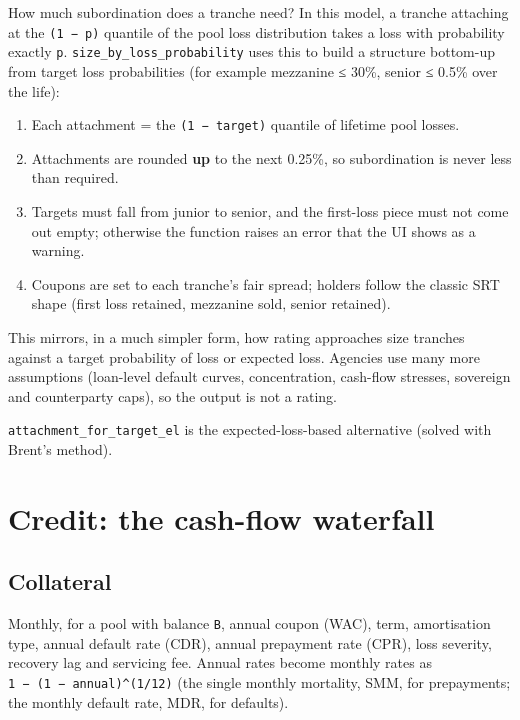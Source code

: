 \documentclass[10pt,a4paper]{article}
\providecommand{\tightlist}{\setlength{\itemsep}{1pt}\setlength{\parskip}{0pt}}
\numberwithin{equation}{section}
\begin{document}
How much subordination does a tranche need? In this model, a tranche attaching at the \texttt{(1\ −\ p)} quantile of the pool loss distribution takes a loss with probability exactly \texttt{p}. \texttt{size\_by\_loss\_probability} uses this to build a structure bottom-up from target loss probabilities (for example mezzanine ≤ 30\%, senior ≤ 0.5\% over the life):

\begin{enumerate}
\def\labelenumi{\arabic{enumi}.}
\tightlist
\item
  Each attachment = the \texttt{(1\ −\ target)} quantile of lifetime pool losses.
\item
  Attachments are rounded \textbf{up} to the next 0.25\%, so subordination is never less than required.
\item
  Targets must fall from junior to senior, and the first-loss piece must not come out empty; otherwise the function raises an error that the UI shows as a warning.
\item
  Coupons are set to each tranche's fair spread; holders follow the classic SRT shape (first loss retained, mezzanine sold, senior retained).
\end{enumerate}

This mirrors, in a much simpler form, how rating approaches size tranches against a target probability of loss or expected loss. Agencies use many more assumptions (loan-level default curves, concentration, cash-flow stresses, sovereign and counterparty caps), so the output is not a rating.

\texttt{attachment\_for\_target\_el} is the expected-loss-based alternative (solved with Brent's method).

\section{Credit: the cash-flow waterfall}\label{credit-the-cash-flow-waterfall}

\subsection{Collateral}\label{collateral}

Monthly, for a pool with balance \texttt{B}, annual coupon (WAC), term, amortisation type, annual default rate (CDR), annual prepayment rate (CPR), loss severity, recovery lag and servicing fee. Annual rates become monthly rates as \texttt{1\ −\ (1\ −\ annual)\^{}(1/12)} (the single monthly mortality, SMM, for prepayments; the monthly default rate, MDR, for defaults).
\end{document}
